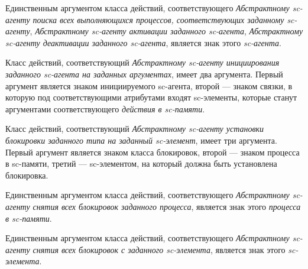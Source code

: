 Единственным аргументом класса действий, соответствующего \textit{Абстрактному sc-агенту поиска всех выполняющихся процессов, соответствующих заданному sc-агенту}, \textit{Абстрактному sc-агенту активации заданного sc-агента}, \textit{Абстрактному sc-агенту деактивации заданного sc-агента}, является знак этого \textit{sc-агента}.

Класс действий, соответствующий \textit{Абстрактному sc-агенту инициирования заданного sc-агента на заданных аргументах}, имеет два аргумента. Первый аргумент является знаком инициируемого sc-агента, второй --- знаком связки, в которую под соответствующими атрибутами входят sc-элементы, которые станут аргументами соответствующего \textit{действия в sc-памяти}.

Класс действий, соответствующий \textit{Абстрактному sc-агенту установки блокировки заданного типа на заданный sc-элемент}, имеет три аргумента. Первый аргумент является знаком класса блокировок, второй --- знаком процесса в sc-памяти, третий --- sc-элементом, на который должна быть установлена блокировка.

Единственным аргументом класса действий, соответствующего \textit{Абстрактному sc-агенту снятия всех блокировок заданного процесса}, является знак этого \textit{процесса в sc-памяти}.

Единственным аргументом класса действий, соответствующего \textit{Абстрактному sc-агенту снятия всех блокировок с заданного sc-элемента}, является знак этого \textit{sc-элемента}.

